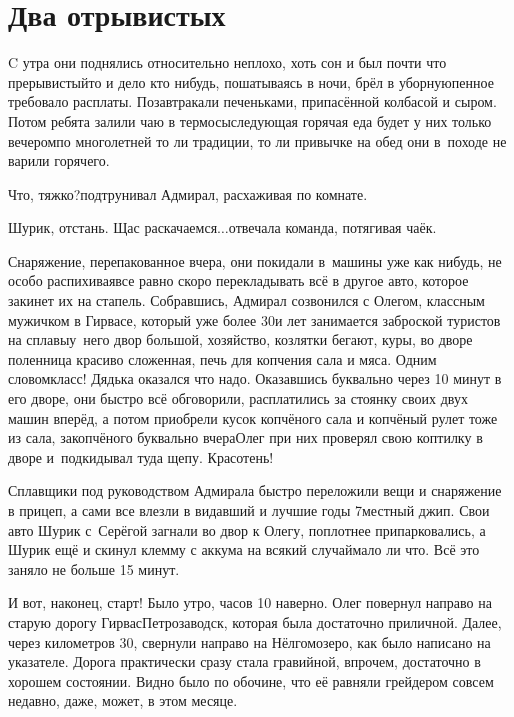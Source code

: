\chapter{Два отрывистых}
\vepsianrose

C утра они поднялись относительно неплохо, хоть сон и был почти что прерывистый\mdash то и дело кто нибудь, пошатываясь в ночи, брёл в уборную\mdash пенное требовало расплаты. Позавтракали печеньками, припасённой колбасой и сыром. Потом ребята залили чаю в термосы\mdash следующая горячая еда будет у них только вечером\mdash по многолетней то ли традиции, то ли привычке на обед они в~походе не варили горячего.

\diagdash Что, тяжко?\mdash подтрунивал Адмирал, расхаживая по комнате.

\diagdash Шурик, отстань. Щас раскачаемся$\ldots$\mdash отвечала команда, потягивая чаёк.

Снаряжение, перепакованное вчера, они покидали в~машины уже как нибудь, не особо распихивая\mdash все равно скоро перекладывать всё в другое авто, которое закинет их на стапель. Собравшись, Адмирал созвонился с Олегом, классным мужичком в Гирвасе, который уже более 30\sdash и лет занимается заброской туристов на сплавы\mdash у~него двор большой, хозяйство, козлятки бегают, куры, во дворе поленница красиво сложенная, печь для копчения сала и мяса. Одним словом\mdash класс! Дядька оказался что надо. Оказавшись буквально через 10 минут в его дворе, они быстро всё обговорили, расплатились за стоянку своих двух машин вперёд, а потом приобрели кусок копчёного сала и копчёный рулет тоже из сала, закопчёного буквально вчера\mdash Олег при них проверял свою коптилку в дворе и~подкидывал туда щепу. Кра\sdash со\sdash тень! 

Сплавщики под руководством Адмирала быстро переложили вещи и снаряжение в прицеп, а сами все влезли в видавший и лучшие годы 7\sdash местный джип. Свои авто Шурик с~Серёгой загнали во двор к Олегу, поплотнее припарковались, а Шурик ещё и скинул клемму с аккума на всякий случай\mdash мало ли что. Всё это заняло не больше 15 минут.

И вот, наконец, старт! Было утро, часов 10 наверно. Олег повернул направо на старую дорогу Гирвас\mdash Петрозаводск, которая была достаточно приличной. Далее, через километров 30, свернули направо на Нёлгомозеро, как было написано на указателе. Дорога практически сразу стала гравийной, впрочем, достаточно в хорошем состоянии. Видно было по обочине, что её равняли грейдером совсем недавно, даже, может, в этом месяце.


